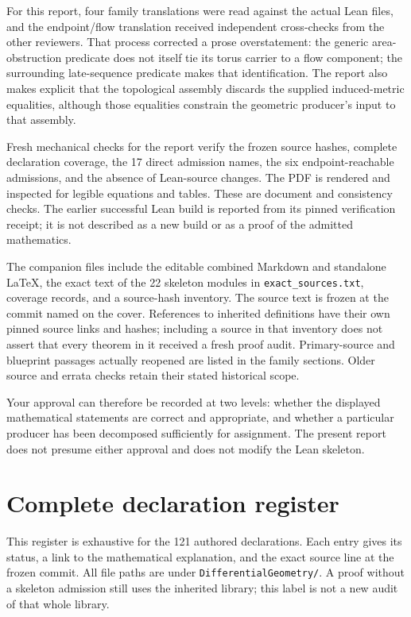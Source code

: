 \documentclass[
  letterpaper,
  11pt]{article}
\begin{document}
For this report, four family translations were read against the actual
Lean files, and the endpoint/flow translation received independent
cross-checks from the other reviewers. That process corrected a prose
overstatement: the generic area-obstruction predicate does not itself
tie its torus carrier to a flow component; the surrounding late-sequence
predicate makes that identification. The report also makes explicit that
the topological assembly discards the supplied induced-metric
equalities, although those equalities constrain the geometric producer's
input to that assembly.

Fresh mechanical checks for the report verify the frozen source hashes,
complete declaration coverage, the 17 direct admission names, the six
endpoint-reachable admissions, and the absence of Lean-source changes.
The PDF is rendered and inspected for legible equations and tables.
These are document and consistency checks. The earlier successful Lean
build is reported from its pinned verification receipt; it is not
described as a new build or as a proof of the admitted mathematics.

The companion files include the editable combined Markdown and
standalone LaTeX, the exact text of the 22 skeleton modules in
{\small\texttt{exact\_\allowbreak{}sources.\allowbreak{}txt}}, coverage
records, and a source-hash inventory. The source text is frozen at the
commit named on the cover. References to inherited definitions have
their own pinned source links and hashes; including a source in that
inventory does not assert that every theorem in it received a fresh
proof audit. Primary-source and blueprint passages actually reopened are
listed in the family sections. Older source and errata checks retain
their stated historical scope.

Your approval can therefore be recorded at two levels: whether the
displayed mathematical statements are correct and appropriate, and
whether a particular producer has been decomposed sufficiently for
assignment. The present report does not presume either approval and does
not modify the Lean skeleton.

\section{Complete declaration register}\label{declaration-register}

This register is exhaustive for the 121 authored declarations. Each
entry gives its status, a link to the mathematical explanation, and the
exact source line at the frozen commit. All file paths are under
{\small\texttt{Differential\allowbreak{}Geometry/\allowbreak{}}}. A
proof without a skeleton admission still uses the inherited library;
this label is not a new audit of that whole library.
\end{document}
